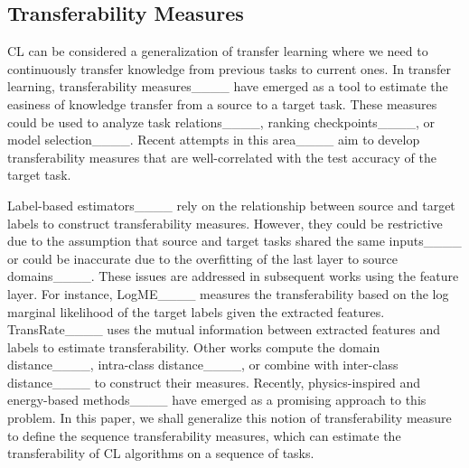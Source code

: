 \subsection{Transferability Measures}

CL can be considered a generalization of transfer learning where we need to continuously transfer knowledge from previous tasks to current ones. In transfer learning, transferability measures____ have emerged as a tool to estimate the easiness of knowledge transfer from a source to a target task. These measures could be used to analyze task relations____, ranking checkpoints____, or model selection____. Recent attempts in this area____ aim to develop transferability measures that are well-correlated with the test accuracy of the target task. 

Label-based estimators____ rely on the relationship between source and target labels to construct transferability measures. However, they could be restrictive due to the assumption that source and target tasks shared the same inputs____ or could be inaccurate due to the overfitting of the last layer to source domains____. These issues are addressed in subsequent works using the feature layer. For instance, LogME____ measures the transferability based on the log marginal likelihood of the target labels given the extracted features. TransRate____ uses the mutual information between extracted features and labels to estimate transferability. Other works compute the domain distance____, intra-class distance____, or combine with inter-class distance____ to construct their measures. Recently, physics-inspired and energy-based methods____ have emerged as a promising approach to this problem. In this paper, we shall generalize this notion of transferability measure to define the sequence transferability measures, which can estimate the transferability of CL algorithms on a sequence of tasks.